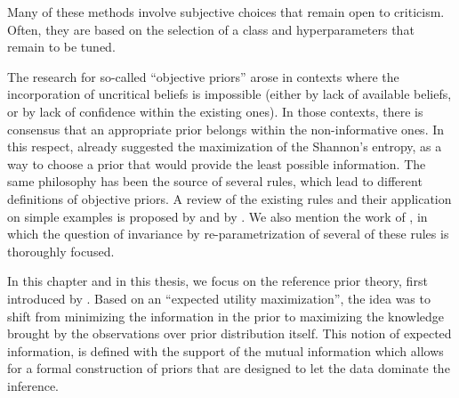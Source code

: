 Many of these  methods involve subjective choices that remain open to criticism. Often, they are based on the selection of a class and hyperparameters that remain to be tuned.

The research for so-called ``objective priors'' arose in contexts where the incorporation of uncritical beliefs is impossible (either by lack of available beliefs, or by lack of confidence within the existing ones).
In those contexts, there is consensus that an appropriate prior belongs within the non-informative ones. In this respect, \citet{lindley_measure_1956} already suggested the maximization of the Shannon's entropy, as a way to choose a prior that would provide the least possible information.
The same philosophy has been the source of several rules, which lead to different definitions of objective priors. {A review of the  existing rules and their application on simple examples is proposed by \cite{kass_selection_1996} and by \citet{berger_overall_2015}. We also mention the work of  \citet{datta_invariance_1996}, in which the question of invariance by re-parametrization of several of these rules is thoroughly focused.}




In this chapter and in this thesis, we focus on the reference prior theory, first introduced by \citet{bernardo_expected_1979}. 
Based on an ``expected utility maximization'',
the idea was to shift from minimizing the information in the prior to maximizing the knowledge brought by the observations over prior distribution itself.
This notion of expected information, is defined with the support of the mutual information which allows for a formal construction of priors that are designed to let the data dominate the inference.

